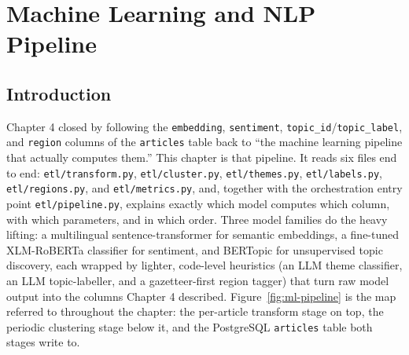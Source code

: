 \chapter{Machine Learning and NLP Pipeline}

\section{Introduction}
\begin{sloppypar}
Chapter 4 closed by following the \texttt{embedding}, \texttt{sentiment}, \texttt{topic\_id}\allowbreak/\allowbreak\texttt{topic\_label}, and \texttt{region} columns of the \texttt{articles} table back to ``the machine learning pipeline that actually computes them.'' This chapter is that pipeline. It reads six files end to end: \texttt{etl/\allowbreak transform.py}, \texttt{etl/\allowbreak cluster.py}, \texttt{etl/\allowbreak themes.py}, \texttt{etl/\allowbreak labels.py}, \texttt{etl/\allowbreak regions.py}, and \texttt{etl/\allowbreak metrics.py}, and, together with the orchestration entry point \texttt{etl/\allowbreak pipeline.py}, explains exactly which model computes which column, with which parameters, and in which order. Three model families do the heavy lifting: a multilingual sentence-transformer for semantic embeddings, a fine-tuned XLM-RoBERTa classifier for sentiment, and BERTopic for unsupervised topic discovery, each wrapped by lighter, code-level heuristics (an LLM theme classifier, an LLM topic-labeller, and a gazetteer-first region tagger) that turn raw model output into the columns Chapter 4 described. Figure~\ref{fig:ml-pipeline} is the map referred to throughout the chapter: the per-article transform stage on top, the periodic clustering stage below it, and the PostgreSQL \texttt{articles} table both stages write to.
\end{sloppypar}

